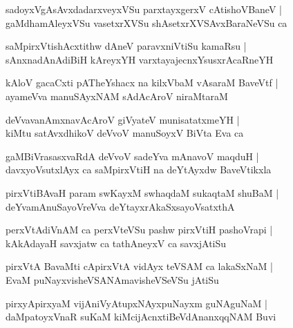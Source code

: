 \documentclass[twoside,12pt,openright]{book}
\newcounter{shloka}[chapter]
\begin{document}
\begin{shloka}%
sadoyxVgAsAvxdadarxveyxVSu parxtayxgerxV cAtishoVBaneV |\\
gaMdhamAleyxVSu vasetxrXVSu shAsetxrXVSAvxBaraNeVSu ca 
\end{shloka}

\begin{shloka}%
saMpirxVtishAcxtithw dAneV paravxniVtiSu kamaRsu |\\
sAnxnadAnAdiBiH kAreyxYH varxtayajecnxYsusxrAcaRneYH
\end{shloka}

\begin{shloka}%
kAloV gacaCxti pATheYshacx na kilxVbaM vAsaraM BaveVtf |\\
ayameVva manuSAyxNAM sAdAcAroV niraMtaraM 
\end{shloka}

\begin{shloka}%
deVvavanAmxnavAcAroV giVyateV munisatatxmeYH |\\
kiMtu satAvxdhikoV deVvoV manuSoyxV BiVta Eva ca 
\end{shloka}

\begin{shloka}%
gaMBiVrasasxvaRdA deVvoV sadeYva mAnavoV maqduH |\\
davxyoVsutxlAyx ca saMpirxVtiH na deYtAyxdw BaveVtikxla 
\end{shloka}

\begin{shloka}%
pirxVtiBAvaH param swKayxM swhaqdaM sukaqtaM shuBaM |\\
deYvamAnuSayoVreVva deYtayxrAkaSxsayoVsatxthA 
\end{shloka}

\begin{shloka}%
perxVtAdiVnAM ca perxVteVSu pashw pirxVtiH pashoVrapi |\\
kAkAdayaH savxjatw ca tathAneyxV ca savxjAtiSu
\end{shloka}

\begin{shloka}%
pirxVtA BavaMti cApirxVtA vidAyx teVSAM ca lakaSxNaM |\\
EvaM puNayxvisheVSANAmavisheVSeVSu jAtiSu
\end{shloka}

\begin{shloka}%
pirxyApirxyaM vijAniVyAtupxNAyxpuNayxm guNAguNaM |\\
daMpatoyxVnaR suKaM kiMcijAcnxtiBeVdAnanxqqNAM Buvi 
\end{shloka}
\end{document}
